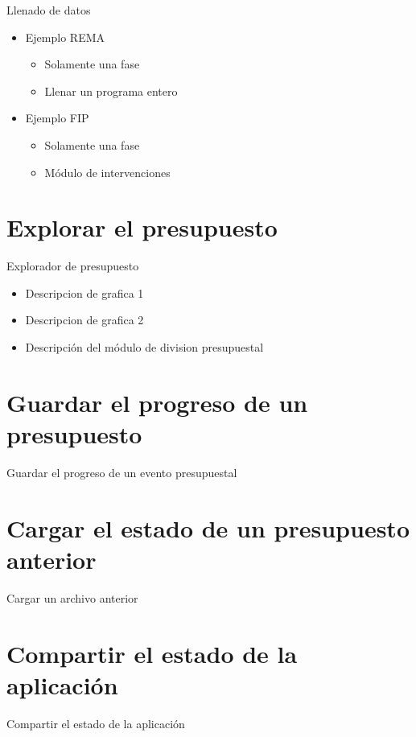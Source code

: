 \documentclass[
]{book}
\begin{document}
Llenado de datos

\begin{itemize}
\item
  Ejemplo REMA

  \begin{itemize}
  \item
    Solamente una fase
  \item
    Llenar un programa entero
  \end{itemize}
\item
  Ejemplo FIP

  \begin{itemize}
  \item
    Solamente una fase
  \item
    Módulo de intervenciones
  \end{itemize}
\end{itemize}

\hypertarget{explorar}{%
\chapter{Explorar el presupuesto}\label{explorar}}

Explorador de presupuesto

\begin{itemize}
\item
  Descripcion de grafica 1
\item
  Descripcion de grafica 2
\item
  Descripción del módulo de division presupuestal
\end{itemize}

\hypertarget{guardar}{%
\chapter{Guardar el progreso de un presupuesto}\label{guardar}}

Guardar el progreso de un evento presupuestal

\hypertarget{cargar}{%
\chapter{Cargar el estado de un presupuesto anterior}\label{cargar}}

Cargar un archivo anterior

\hypertarget{compartir}{%
\chapter{Compartir el estado de la aplicación}\label{compartir}}

Compartir el estado de la aplicación

  
\end{document}
